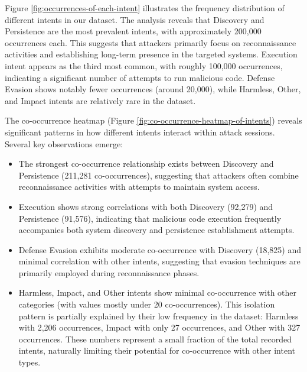         Figure \ref{fig:occurrences-of-each-intent} illustrates the frequency distribution of different intents in our dataset. The analysis reveals that Discovery and Persistence are the most prevalent intents, with approximately 200,000 occurrences each. This suggests that attackers primarily focus on reconnaissance activities and establishing long-term presence in the targeted systems. Execution intent appears as the third most common, with roughly 100,000 occurrences, indicating a significant number of attempts to run malicious code. Defense Evasion shows notably fewer occurrences (around 20,000), while Harmless, Other, and Impact intents are relatively rare in the dataset.

        The co-occurrence heatmap (Figure \ref{fig:co-occurrence-heatmap-of-intents}) reveals significant patterns in how different intents interact within attack sessions. Several key observations emerge:

        \begin{itemize}
        
            \item The strongest co-occurrence relationship exists between Discovery and Persistence (211,281 co-occurrences), suggesting that attackers often combine reconnaissance activities with attempts to maintain system access.

            \item Execution shows strong correlations with both Discovery (92,279) and Persistence (91,576), indicating that malicious code execution frequently accompanies both system discovery and persistence establishment attempts.

            \item Defense Evasion exhibits moderate co-occurrence with Discovery (18,825) and minimal correlation with other intents, suggesting that evasion techniques are primarily employed during reconnaissance phases.

            \item Harmless, Impact, and Other intents show minimal co-occurrence with other categories (with values mostly under 20 co-occurrences). This isolation pattern is partially explained by their low frequency in the dataset: Harmless with 2,206 occurrences, Impact with only 27 occurrences, and Other with 327 occurrences. These numbers represent a small fraction of the total recorded intents, naturally limiting their potential for co-occurrence with other intent types.
            
        \end{itemize}

